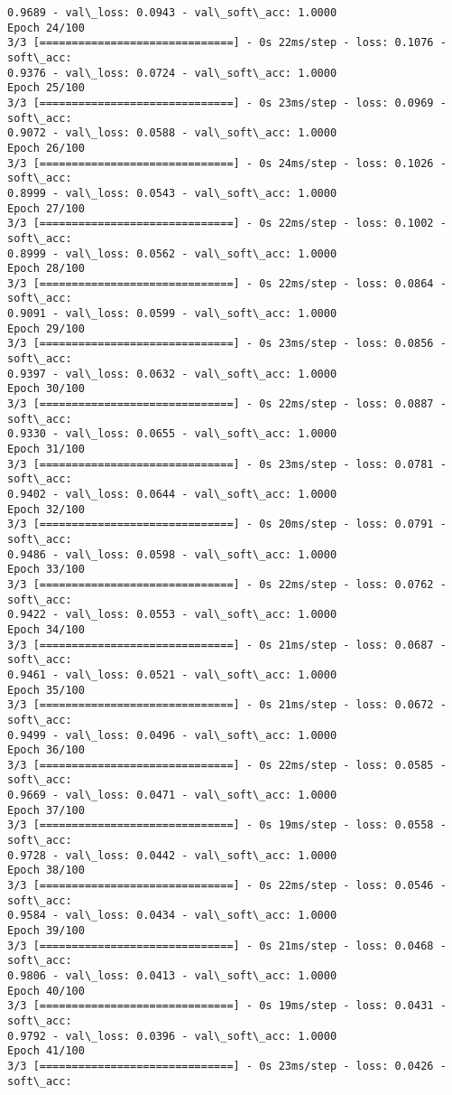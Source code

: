 \documentclass[11pt]{article}
\begin{document}
\begin{Verbatim}[commandchars=\\\{\}]
0.9689 - val\_loss: 0.0943 - val\_soft\_acc: 1.0000
Epoch 24/100
3/3 [==============================] - 0s 22ms/step - loss: 0.1076 - soft\_acc:
0.9376 - val\_loss: 0.0724 - val\_soft\_acc: 1.0000
Epoch 25/100
3/3 [==============================] - 0s 23ms/step - loss: 0.0969 - soft\_acc:
0.9072 - val\_loss: 0.0588 - val\_soft\_acc: 1.0000
Epoch 26/100
3/3 [==============================] - 0s 24ms/step - loss: 0.1026 - soft\_acc:
0.8999 - val\_loss: 0.0543 - val\_soft\_acc: 1.0000
Epoch 27/100
3/3 [==============================] - 0s 22ms/step - loss: 0.1002 - soft\_acc:
0.8999 - val\_loss: 0.0562 - val\_soft\_acc: 1.0000
Epoch 28/100
3/3 [==============================] - 0s 22ms/step - loss: 0.0864 - soft\_acc:
0.9091 - val\_loss: 0.0599 - val\_soft\_acc: 1.0000
Epoch 29/100
3/3 [==============================] - 0s 23ms/step - loss: 0.0856 - soft\_acc:
0.9397 - val\_loss: 0.0632 - val\_soft\_acc: 1.0000
Epoch 30/100
3/3 [==============================] - 0s 22ms/step - loss: 0.0887 - soft\_acc:
0.9330 - val\_loss: 0.0655 - val\_soft\_acc: 1.0000
Epoch 31/100
3/3 [==============================] - 0s 23ms/step - loss: 0.0781 - soft\_acc:
0.9402 - val\_loss: 0.0644 - val\_soft\_acc: 1.0000
Epoch 32/100
3/3 [==============================] - 0s 20ms/step - loss: 0.0791 - soft\_acc:
0.9486 - val\_loss: 0.0598 - val\_soft\_acc: 1.0000
Epoch 33/100
3/3 [==============================] - 0s 22ms/step - loss: 0.0762 - soft\_acc:
0.9422 - val\_loss: 0.0553 - val\_soft\_acc: 1.0000
Epoch 34/100
3/3 [==============================] - 0s 21ms/step - loss: 0.0687 - soft\_acc:
0.9461 - val\_loss: 0.0521 - val\_soft\_acc: 1.0000
Epoch 35/100
3/3 [==============================] - 0s 21ms/step - loss: 0.0672 - soft\_acc:
0.9499 - val\_loss: 0.0496 - val\_soft\_acc: 1.0000
Epoch 36/100
3/3 [==============================] - 0s 22ms/step - loss: 0.0585 - soft\_acc:
0.9669 - val\_loss: 0.0471 - val\_soft\_acc: 1.0000
Epoch 37/100
3/3 [==============================] - 0s 19ms/step - loss: 0.0558 - soft\_acc:
0.9728 - val\_loss: 0.0442 - val\_soft\_acc: 1.0000
Epoch 38/100
3/3 [==============================] - 0s 22ms/step - loss: 0.0546 - soft\_acc:
0.9584 - val\_loss: 0.0434 - val\_soft\_acc: 1.0000
Epoch 39/100
3/3 [==============================] - 0s 21ms/step - loss: 0.0468 - soft\_acc:
0.9806 - val\_loss: 0.0413 - val\_soft\_acc: 1.0000
Epoch 40/100
3/3 [==============================] - 0s 19ms/step - loss: 0.0431 - soft\_acc:
0.9792 - val\_loss: 0.0396 - val\_soft\_acc: 1.0000
Epoch 41/100
3/3 [==============================] - 0s 23ms/step - loss: 0.0426 - soft\_acc:

\end{Verbatim}
\end{document}
